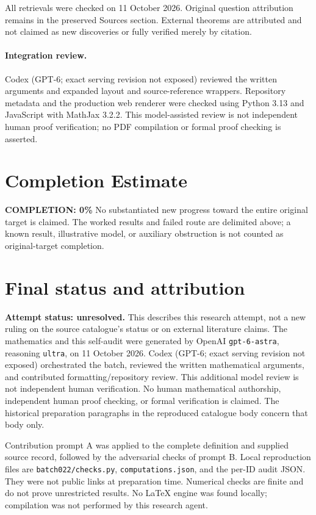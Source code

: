 \documentclass[11pt]{article}
\begin{document}
All retrievals were checked on 11 October 2026. Original question attribution remains in the preserved Sources section. External theorems are attributed and not claimed as new discoveries or fully verified merely by citation.


\paragraph{Integration review.} Codex (GPT-6; exact serving revision not exposed) reviewed the written arguments and expanded layout and source-reference wrappers. Repository metadata and the production web renderer were checked using Python 3.13 and JavaScript with MathJax 3.2.2. This model-assisted review is not independent human proof verification; no PDF compilation or formal proof checking is asserted.

\section{Completion Estimate}
\noindent\textbf{COMPLETION: 0\%}
No substantiated new progress toward the entire original target is claimed. The worked results and failed route are delimited above; a known result, illustrative model, or auxiliary obstruction is not counted as original-target completion.

\section{Final status and attribution}
\textbf{Attempt status: unresolved.} This describes this research attempt, not a new ruling on the source catalogue's status or on external literature claims.
The mathematics and this self-audit were generated by OpenAI \texttt{gpt-6-astra}, reasoning \texttt{ultra}, on 11 October 2026. Codex (GPT-6; exact serving revision not exposed) orchestrated the batch, reviewed the written mathematical arguments, and contributed formatting/repository review. This additional model review is not independent human verification. No human mathematical authorship, independent human proof checking, or formal verification is claimed. The historical preparation paragraphs in the reproduced catalogue body concern that body only.

Contribution prompt A was applied to the complete definition and supplied source record, followed by the adversarial checks of prompt B. Local reproduction files are \texttt{batch022/checks.py}, \texttt{computations.json}, and the per-ID audit JSON. They were not public links at preparation time. Numerical checks are finite and do not prove unrestricted results. No LaTeX engine was found locally; compilation was not performed by this research agent.
\end{document}
